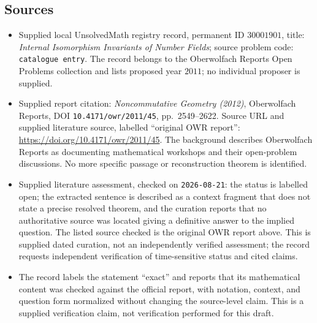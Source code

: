 \documentclass[11pt]{article}
\begin{document}
\subsection{Sources}
\begin{itemize}
\item Supplied local UnsolvedMath registry record, permanent ID \(30001901\), title: \emph{Internal Isomorphism Invariants of Number Fields}; source problem code: \texttt{catalogue entry}. The record belongs to the Oberwolfach Reports Open Problems collection and lists proposed year \(2011\); no individual proposer is supplied.
\item Supplied report citation: \emph{Noncommutative Geometry (2012)}, Oberwolfach Reports, DOI \texttt{10.4171/owr/2011/45}, pp.\ 2549--2622. Source URL and supplied literature source, labelled ``original OWR report'': \url{https://doi.org/10.4171/owr/2011/45}. The background describes Oberwolfach Reports as documenting mathematical workshops and their open-problem discussions. No more specific passage or reconstruction theorem is identified.
\item Supplied literature assessment, checked on \texttt{2026-08-21}: the status is labelled open; the extracted sentence is described as a context fragment that does not state a precise resolved theorem, and the curation reports that no authoritative source was located giving a definitive answer to the implied question. The listed source checked is the original OWR report above. This is supplied dated curation, not an independently verified assessment; the record requests independent verification of time-sensitive status and cited claims.
\item The record labels the statement ``exact'' and reports that its mathematical content was checked against the official report, with notation, context, and question form normalized without changing the source-level claim. This is a supplied verification claim, not verification performed for this draft.
\end{itemize}
\end{document}
